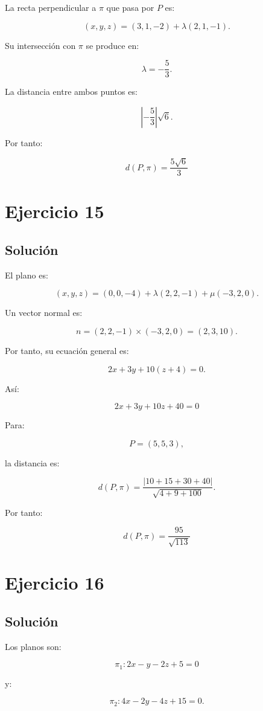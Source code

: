 \documentclass[11pt,a4paper]{article}
\begin{document}
La recta perpendicular a \(\pi\) que pasa por \(P\) es:

\[
(x,y,z)
=
(3,1,-2)
+
\lambda(2,1,-1).
\]

Su intersección con \(\pi\) se produce en:

\[
\lambda=-\frac53.
\]

La distancia entre ambos puntos es:

\[
\left|
-\frac53
\right|
\sqrt6.
\]

Por tanto:

\[
\boxed{
d(P,\pi)
=
\frac{5\sqrt6}{3}
}
\]

\section{Ejercicio 15}
\subsection{Solución}

El plano es:

\[
(x,y,z)
=
(0,0,-4)
+
\lambda(2,2,-1)
+
\mu(-3,2,0).
\]

Un vector normal es:

\[
n
=
(2,2,-1)\times(-3,2,0)
=
(2,3,10).
\]

Por tanto, su ecuación general es:

\[
2x+3y+10(z+4)=0.
\]

Así:

\[
\boxed{
2x+3y+10z+40=0
}
\]

Para:

\[
P=(5,5,3),
\]

la distancia es:

\[
d(P,\pi)
=
\frac{
|10+15+30+40|
}{
\sqrt{4+9+100}
}.
\]

Por tanto:

\[
\boxed{
d(P,\pi)
=
\frac{95}{\sqrt{113}}
}
\]

\section{Ejercicio 16}
\subsection{Solución}

Los planos son:

\[
\pi_1:
2x-y-2z+5=0
\]

y:

\[
\pi_2:
4x-2y-4z+15=0.
\]
\end{document}
